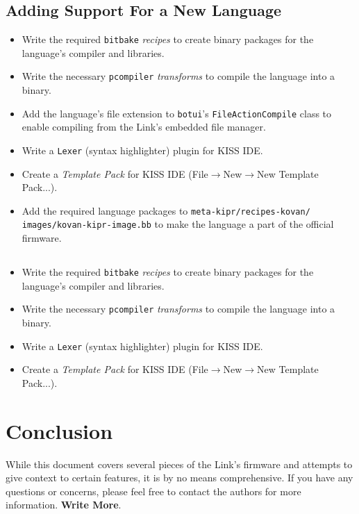 \documentclass[12pt,letterpaper]{article}
\begin{document}
	\subsection{Adding Support For a New Language}
	\begin{itemize}
		\setlength{\itemsep}{0em}
		\renewcommand{\labelitemi}{$\square$} 
		\item Write the required \texttt{bitbake} \emph{recipes} to create binary packages for the language's compiler and libraries.
		\item Write the necessary \texttt{pcompiler} \emph{transforms} to compile the language into a binary.
		\item Add the language's file extension to \texttt{botui}'s \texttt{FileActionCompile} class to enable compiling from
		the Link's embedded file manager.
		\item Write a \texttt{Lexer} (syntax highlighter) plugin for KISS IDE.
		\item Create a \emph{Template Pack} for KISS IDE (File$\rightarrow$New$\rightarrow$New Template Pack...).
		\item Add the required language packages to \texttt{meta-kipr/recipes-kovan/}\\\texttt{images/kovan-kipr-image.bb} to make the language
		a part of the official firmware.
	\end{itemize}
	
	\subsection{}
	\begin{itemize}
		\setlength{\itemsep}{0em}
		\renewcommand{\labelitemi}{$\square$} 
		\item Write the required \texttt{bitbake} \emph{recipes} to create binary packages for the language's compiler and libraries.
		\item Write the necessary \texttt{pcompiler} \emph{transforms} to compile the language into a binary.
		\item Write a \texttt{Lexer} (syntax highlighter) plugin for KISS IDE.
		\item Create a \emph{Template Pack} for KISS IDE (File$\rightarrow$New$\rightarrow$New Template Pack...).
	\end{itemize}
	
	
	
	\section{Conclusion}
	While this document covers several pieces of the Link's firmware and attempts to give context to certain features, it is by no means
	comprehensive. If you have any questions or concerns, please feel free to contact the authors for more information. \textbf{Write More}.
	
\end{document}
